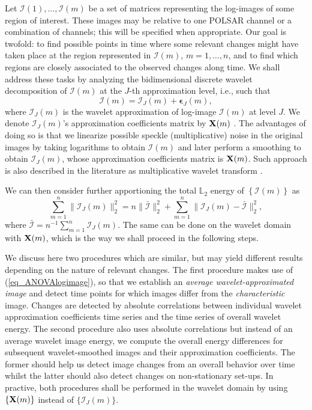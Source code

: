 \documentclass[journal]{IEEEtran}
\newcommand{\vepsilon}{\pmb{\epsilon}}
\newcommand{\vX}{{\textbf X}}
\begin{document}
Let $\mathcal{I}(1),\ldots,\mathcal{I}(m)$ be a set of matrices representing the log-images of some region of interest. These images may be relative to one POLSAR channel or a combination of channels; this will be specified when appropriate. Our goal is twofold: to find possible points in time where some relevant changes might have taken place at the region represented in $\mathcal{I}(m)$, $m=1,\ldots,n$, and to find which regions are closely associated to the observed changes along time. We shall address these tasks by analyzing the bidimensional discrete wavelet decomposition of $\mathcal{I}(m)$ at the $J$-th approximation level, i.e., 
such that
\begin{equation} 
\mathcal{I}(m)=\mathcal{I}_J(m)+\vepsilon_J(m),
\end{equation}
where $\mathcal{I}_J(m)$ is the wavelet approximation of log-image $\mathcal{I}(m)$ at level $J$. We denote $\mathcal{I}_J(m)$'s approximation coefficients matrix by $\vX(m)$ \cite{morettin2017wavelets,vidakovic1999statistical}. The advantages of doing so is that we linearize possible speckle (multiplicative) noise in the original images by taking logarithms to obtain $\mathcal{I}(m)$ and later perform a smoothing to obtain $\mathcal{I}_J(m)$, whose approximation coefficients matrix is $\vX(m)$. Such approach is also described in the literature as multiplicative wavelet transform \cite{atto2016wavelet}.


We can then consider further apportioning the total $\mathbb{L}_2$ energy of $\left\{\mathcal I(m)\right\}$ as
\begin{equation} 
\sum_{m=1}^n\|\mathcal I_J(m)\|^2_2=n\|\bar{\mathcal I}\|^2_2+\sum_{m=1}^n\|\mathcal I_J(m)-\bar{\mathcal I}\|^2_2,\label{eq_ANOVAlogimage}
\end{equation}
where $\bar{\mathcal{I}}=n^{-1}\sum_{m=1}^n\mathcal{I}_J(m)$. The same can be done on the wavelet domain with $\vX(m)$, which is the way we shall proceed in the following steps.


We discuss here two procedures which are similar, but may yield different results depending on the nature of relevant changes. The first procedure makes use of (\ref{eq_ANOVAlogimage}), so that we establish an {\it average wavelet-approximated image} and detect time points for which images differ from the {\it characteristic} image. Changes are detected by absolute correlations between individual wavelet approximation coefficients time series and the time series of overall wavelet energy. The second procedure also uses absolute correlations but instead of an average wavelet image energy, we compute  the overall energy differences for subsequent wavelet-smoothed images and their approximation coefficients. The former should help us detect image changes from an overall behavior over time whilst the latter should also detect changes on non-stationary set-ups.  In practive, both procedures shall be performed in the wavelet domain by using $\{\vX(m)\}$ instead of $\{\mathcal{I}_J(m)\}$.
\end{document}
